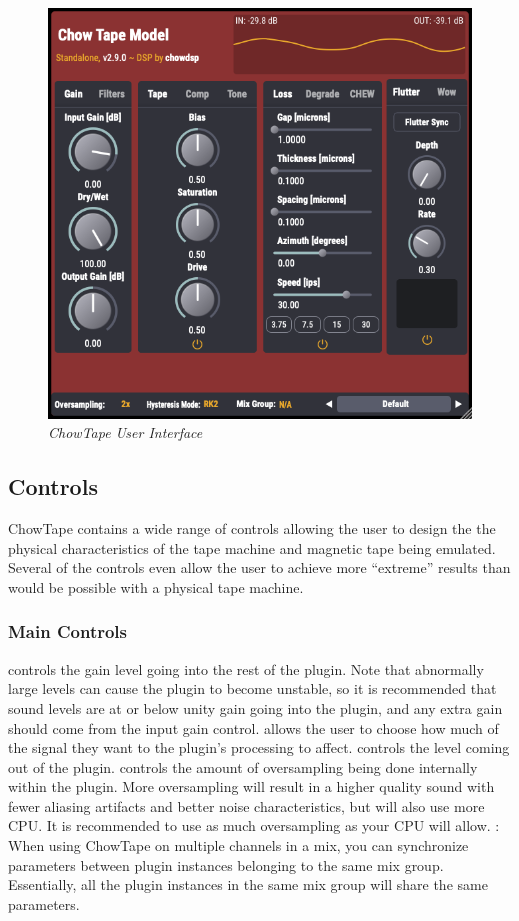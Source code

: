 \documentclass[landscape,twocolumn,a5paper]{manual}
\begin{document}
\begin{figure}[ht]
    \center
    \includegraphics[width=0.55\columnwidth]{../Plugin/Screenshots/full_gui.png}
    \caption{\label{full_gui}{\it ChowTape User Interface}}
\end{figure}

\subsection{Controls}
ChowTape contains a wide range of controls allowing the
user to design the the physical characteristics of the tape
machine and magnetic tape being emulated. Several of the
controls even allow the user to achieve more ``extreme''
results than would be possible with a physical tape machine.

\subsubsection{Main Controls}
 controls the gain level going into
the rest of the plugin. Note that abnormally large levels
can cause the plugin to become unstable, so it is recommended
that sound levels are at or below unity gain going into the
plugin, and any extra gain should come from the input gain
control.
\newpar
{} allows the user to choose how much of the
signal they want to the plugin's processing to affect.
\newpar
{} controls the level coming out of the plugin.
\newpar
{} controls the amount of oversampling
being done internally within the plugin. More oversampling
will result in a higher quality sound with fewer aliasing
artifacts and better noise characteristics, but will also
use more CPU. It is recommended to use as much oversampling
as your CPU will allow.
\newpar
{}: When using ChowTape on multiple channels
in a mix, you can synchronize parameters between plugin
instances belonging to the same mix group. Essentially, all
the plugin instances in the same mix group will share the same
parameters.
\end{document}
